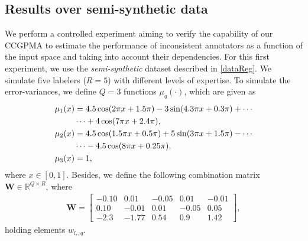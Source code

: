 \documentclass[journal]{IEEEtran}
\providecommand{\mat}[1]{{\bm{#1}}} %
\newcommand{\Real}{\mathbb{R}}
\providecommand{\mat}[1]{{\mathbf{#1}}}
\begin{document}
\subsection{Results over semi-synthetic data}
We perform a controlled experiment aiming to verify the capability of our CCGPMA to estimate the performance of inconsistent annotators as a function of the input space and taking into account their dependencies. For this first experiment, we use the \textit{semi-synthetic} dataset described in \cref{dataReg}. We simulate five labelers ($R=5$) with different levels of expertise. To simulate the error-variances, we define $Q=3$ functions $\mu_q(\cdot)$, which are given as 
\begin{align}
\label{eq:u1r}
\notag \mu_1(x) &= 4.5\cos(2\pi x + 1.5\pi) - 3\sin(4.3\pi x + 0.3\pi) +\cdots\\ & \cdots + 4\cos(7\pi x + 2.4\pi),\\
\label{eq:u2r}
\notag \mu_2(x) &= 4.5\cos(1.5\pi x + 0.5\pi) + 5\sin(3\pi x + 1.5\pi) - \cdots\\ & \cdots - 4.5\cos(8\pi x+ 0.25\pi),\\
\label{eq:u3r}
\mu_3(x) &= 1,
\end{align}
where $x\in [0,1]$. Besides, we define the following combination matrix $\mat{W} \in \Real^{Q\times R}$, where
\begin{align}
\mat{W}=\begin{bmatrix}
-0.10  &  0.01   & -0.05 &  0.01  & -0.01\\
0.10   &  -0.01  & 0.01  &  -0.05 & 0.05\\
-2.3   &  -1.77  & 0.54  &  0.9   & 1.42
\end{bmatrix},
\label{eq:parametersP}
\end{align}
holding elements $w_{l_r,q}$. 
\end{document}
